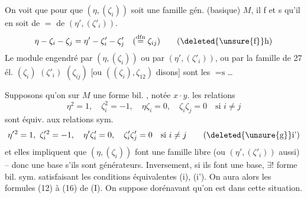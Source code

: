 On voit que pour que $(\eta,(\zeta_i))$ soit une famille gén. (basique)  $M$, il f et s qu'il en soit de $=$ de $(\eta',(\zeta'_i))$.  
\[
\eta-\zeta_i-\zeta_j=\eta'-\zeta'_i-\zeta'_j\quad(\overset{\mathrm{dfn}}=\zeta_{ij})\tag*{(\deleted{\unsure{f}}h)}
\]
Le module engendré par  $(\eta,(\zeta_i))$ ou par $(\eta',(\zeta'_i))$, ou par la  famille de 27 él. $(\zeta_i)$ $(\zeta'_i)$ $(\zeta_{ij})$ [ou  $((\zeta_i),\zeta_{12})$ disons] sont les $=\text{s}$\ldots

Supposons qu'on   sur $M$ une forme bil. , notée $x\cdot y$.   les relations
\[
\eta^2=1,\quad\zeta_i^2=-1,\quad\eta\zeta_i=0,\quad\zeta_i\zeta_j=0\quad\text{si }i\ne j\tag*{(i)}
\]
sont équiv. aux relations sym.
\[
\eta'{}^2=1,\ \zeta'_i{}^2=-1,\quad\eta'\zeta'_i=0,\quad\zeta'_i\zeta'_j=0\quad\text{si }i\ne j\tag*{(\deleted{\unsure{g}}i')}
\]
et elles impliquent que $(\eta,(\zeta_i))$ font une famille libre (ou $(\eta',(\zeta'_i))$ aussi) -- donc
une base s'ils sont générateurs. Inversement, si ils font une base, $\exists!$ forme bil. sym. satisfaisant les conditions équivalentes (i), (i'). On aura alors les formules (12) à (16) de (I). On suppose dorénavant qu'on est dans cette situation.

